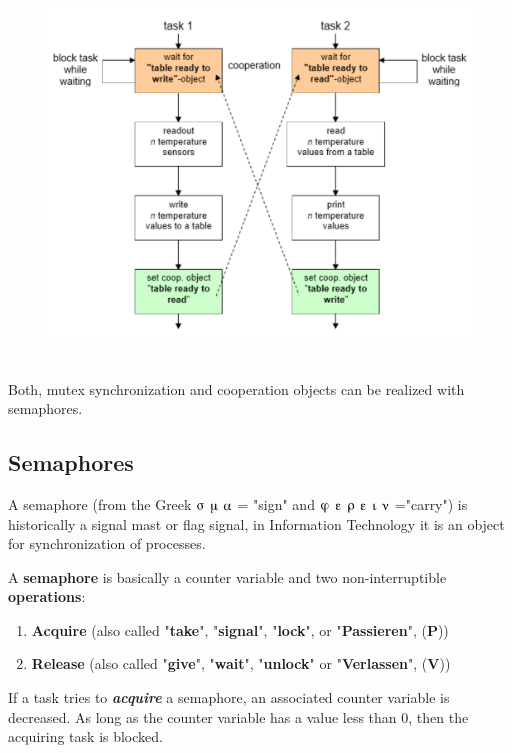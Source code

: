 \begin{enumerate}
 	\begin{figure}[h]
    \centering
    \includegraphics[width=14cm, height=10cm]{Images/image104.png}
    \label{fig:Fig 50}
    \end{figure}
    
Both, mutex synchronization and cooperation objects can be realized with semaphores.
\end{enumerate}
\newpage

\subsection{Semaphores}

A semaphore (from the Greek $\sigmaup$ $\muup$ $\alphaup$ = "sign" and $\varphiup$ $\varepsilonup$ $\rhoup$ $\varepsilonup$ $\iotaup$ $\nuup$ ="carry") is historically a signal mast or flag signal, in Information Technology it is an object for synchronization of processes.


A \textbf{semaphore} is basically a counter variable and two non-interruptible \textbf{operations}:  

\begin{enumerate}
\item  \textbf{Acquire}   (also called "\textbf{take}", "\textbf{signal}",  "\textbf{lock}",     or "\textbf{Passieren}", (\textbf{P}))
\item  \textbf{Release}  (also called "\textbf{give}", "\textbf{wait}",  "\textbf{unlock}"  or "\textbf{Verlassen}", (\textbf{V}))
\end{enumerate}

If a task tries to \textbf{\textit{acquire}} a semaphore, an associated counter variable is decreased. As long as the counter variable has a value less than 0, then the acquiring task is blocked.\\

